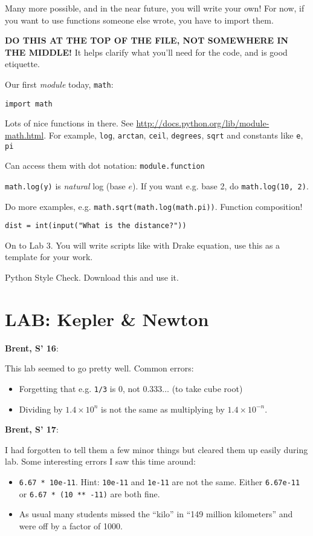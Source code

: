 \documentclass{article}
\newenvironment{reflect}[1]
{
  \noindent
  \begin{lrbox}{\reflectbox}
    \begin{minipage}[t]{\textwidth}
      \textbf{#1}:
}{
    \end{minipage}
  \end{lrbox}
  \fbox{\usebox{\reflectbox}}
}
\begin{document}
Many more possible, and in the near future, you will write your own!
For now, if you want to use functions someone else wrote, you have to
import them.

\textbf{DO THIS AT THE TOP OF THE FILE, NOT SOMEWHERE IN THE MIDDLE!}
It helps clarify what you'll need for the code, and is good etiquette.

Our first \emph{module} today, \verb|math|:
\begin{verbatim}
import math
\end{verbatim}

Lots of nice functions in there.  See
\url{http://docs.python.org/lib/module-math.html}.  For example,
\verb|log|, \verb|arctan|, \verb|ceil|, \verb|degrees|, \verb|sqrt|
and constants like \verb|e|, \verb|pi|

Can access them with dot notation: \verb|module.function|

\verb|math.log(y)| is \emph{natural} log (base $e$). If you want
e.g. base 2, do \verb|math.log(10, 2)|.

Do more examples, e.g. \verb|math.sqrt(math.log(math.pi))|.  Function
composition!

\begin{verbatim}
dist = int(input("What is the distance?"))
\end{verbatim}

On to Lab 3.  You will write scripts like with Drake equation, use
this as a template for your work.

Python Style Check.  Download this and use it.

\section{LAB: Kepler \& Newton}

\begin{reflect}{Brent, S' 16}
This lab seemed to go pretty well.  Common errors:
\begin{itemize}
\item Forgetting that e.g. \verb|1/3| is 0, not $0.333\dots$ (to take
  cube root)
\item Dividing by $1.4\times 10^n$ is not the same as multiplying by
  $1.4 \times 10^{-n}$.
\end{itemize}

\end{reflect}

\begin{reflect}{Brent, S' 17}
  I had forgotten to tell them a few minor things but cleared them up
  easily during lab.  Some interesting errors I saw this time around:
  \begin{itemize}
  \item \verb|6.67 * 10e-11|.  Hint: \verb|10e-11| and \verb|1e-11|
    are not the same.  Either \verb|6.67e-11| or
    \verb|6.67 * (10 ** -11)| are both fine.
  \item As usual many students missed the ``kilo'' in ``149 million
    kilometers'' and were off by a factor of 1000.
  \end{itemize}
\end{reflect}
\end{document}
